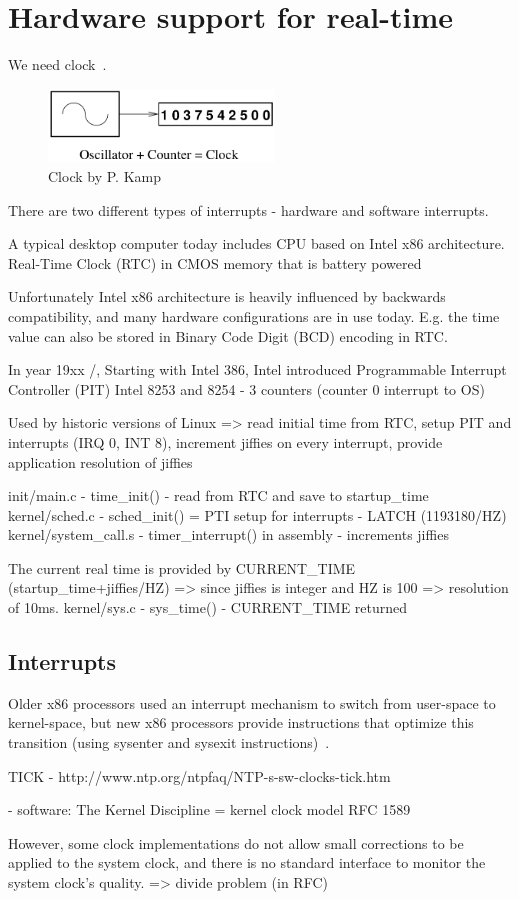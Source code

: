 
\chapter{Hardware support for real-time}

We need clock~\cite{timecounters}.
\begin{figure}
	\centering
	\includegraphics[width=6cm,keepaspectratio]{fig/clock.png}
	\caption{Clock by P. Kamp}
	\label{fig:hw-clock}
\end{figure}

There are two different types of interrupts - hardware and software interrupts.

A typical desktop computer today includes CPU based on Intel x86 architecture.
Real-Time Clock (RTC) in CMOS memory that is battery powered

Unfortunately Intel x86 architecture is heavily influenced by backwards compatibility,
and many hardware configurations are in use today.
E.g. the time value can also be stored in Binary Code Digit (BCD) encoding in RTC.

In year 19xx /, Starting with Intel 386,
Intel introduced
Programmable Interrupt Controller (PIT) Intel 8253 and 8254 - 3 counters (counter 0 interrupt to OS)


Used by historic versions of Linux
=> read initial time from RTC, setup PIT and interrupts (IRQ 0, INT 8), increment jiffies on every interrupt, provide application resolution of jiffies

init/main.c - time\_init() - read from RTC and save to startup\_time
kernel/sched.c - sched\_init() = PTI setup for interrupts - LATCH (1193180/HZ)
kernel/system\_call.s - timer\_interrupt() in assembly - increments jiffies

The current real time is provided by CURRENT\_TIME (startup\_time+jiffies/HZ) => since jiffies is integer and HZ is 100 => resolution of 10ms.
kernel/sys.c - sys\_time() - CURRENT\_TIME returned


\section{Interrupts}
Older x86 processors used an interrupt mechanism to switch from
user-space to kernel-space, but new x86 processors provide instructions
that optimize this transition (using sysenter and sysexit instructions)~\cite{ibm-linux-system-calls}.


TICK - http://www.ntp.org/ntpfaq/NTP-s-sw-clocks-tick.htm


- software:
The Kernel Discipline =  kernel clock model RFC 1589

However, some clock implementations do not allow small corrections to be applied to the system clock, and there is no standard interface to monitor the system clock's quality.
=> divide problem (in RFC)
